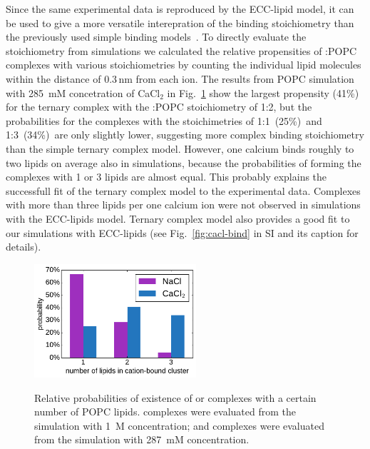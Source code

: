 \documentclass[aip,jcp,twocolumn]{revtex4}
\begin{document}
Since the same experimental data is reproduced by the ECC-lipid model,
it can be used to give a more versatile interepration of the binding stoichiometry than
the previously used simple binding models~\cite{altenbach84,macdonald87}. To directly evaluate the
stoichiometry from simulations we calculated the relative propensities of :POPC
complexes with various stoichiometries by counting the individual lipid
molecules within the distance of $0.3\,\mathrm{nm}$ from each  ion.
The results from POPC simulation with 285~mM concetration of CaCl$_2$ in
Fig.~\ref{fig:cacl_complexes} show the largest propensity (41\%) for the
ternary complex with the :POPC stoichiometry of 1:2, but 
the probabilities for the complexes with the stoichimetries of 1:1~(25\%)~and
1:3~(34\%)~are only slightly lower,
suggesting more complex binding stoichiometry than the simple ternary complex model.
However, one calcium binds roughly to two lipids on average also in simulations,
because the probabilities of forming the complexes with 1 or 3 lipids are almost equal.  
This probably explains the successfull fit of the ternary complex model to the
experimental data. 
Complexes with more than three lipids per one calcium ion were not observed in 
simulations with the ECC-lipids model.
Ternary complex model also provides a good fit 
to our simulations with ECC-lipids 
(see Fig.~\ref{fig:cacl-bind} in SI and its caption for details). 
\begin{figure}[tbp]
  \centering
  \includegraphics[width=6.0cm]{../Fig/ipython_nb/stoichiometry_NaCl-CaCl2_comparison_Ecc-lipids.pdf} \\
  \caption{\label{fig:cacl_complexes}
      Relative probabilities of existence of  or  complexes
      with a certain number of POPC lipids. 
       complexes were evaluated from the simulation with 1~M concentration;
      and  complexes were evaluated from the simulation with 287~mM concentration.
  }
\end{figure}
\end{document}
